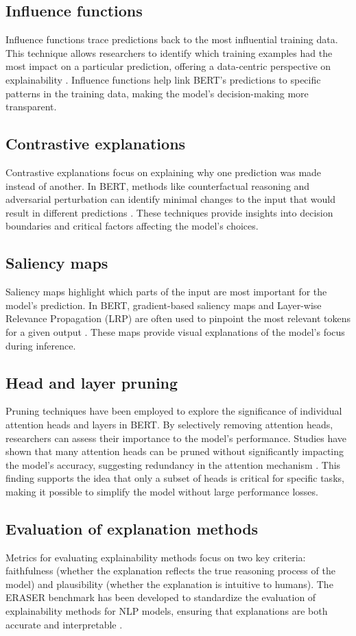 \subsection{Influence functions}
Influence functions trace predictions back to the most influential training data. This technique allows researchers to identify which training examples had the most impact on a particular prediction, offering a data-centric perspective on explainability \cite{koh2017}. Influence functions help link BERT’s predictions to specific patterns in the training data, making the model's decision-making more transparent.

\subsection{Contrastive explanations}
Contrastive explanations focus on explaining why one prediction was made instead of another. In BERT, methods like counterfactual reasoning and adversarial perturbation can identify minimal changes to the input that would result in different predictions \cite{goyal2019}. These techniques provide insights into decision boundaries and critical factors affecting the model’s choices.

\subsection{Saliency maps}
Saliency maps highlight which parts of the input are most important for the model's prediction. In BERT, gradient-based saliency maps and Layer-wise Relevance Propagation (LRP) are often used to pinpoint the most relevant tokens for a given output \cite{sundararajan2017}. These maps provide visual explanations of the model’s focus during inference.

\subsection{Head and layer pruning}
Pruning techniques have been employed to explore the significance of individual attention heads and layers in BERT. By selectively removing attention heads, researchers can assess their importance to the model's performance. Studies have shown that many attention heads can be pruned without significantly impacting the model’s accuracy, suggesting redundancy in the attention mechanism \cite{voita2019}. This finding supports the idea that only a subset of heads is critical for specific tasks, making it possible to simplify the model without large performance losses.

\subsection{Evaluation of explanation methods}
Metrics for evaluating explainability methods focus on two key criteria: faithfulness (whether the explanation reflects the true reasoning process of the model) and plausibility (whether the explanation is intuitive to humans). The ERASER benchmark has been developed to standardize the evaluation of explainability methods for NLP models, ensuring that explanations are both accurate and interpretable \cite{deyoung2020}.